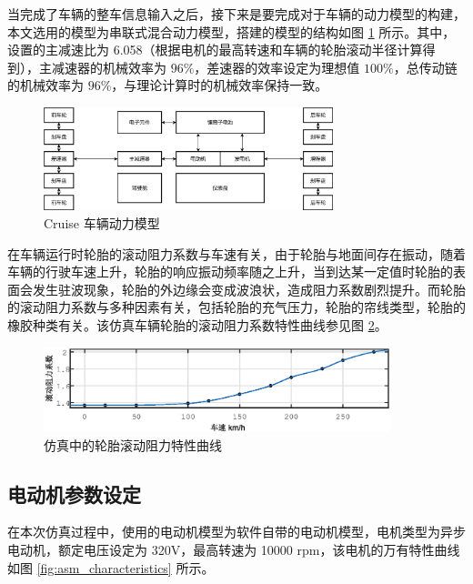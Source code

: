 当完成了车辆的整车信息输入之后，接下来是要完成对于车辆的动力模型的构建，本文选用的模型为串联式混合动力模型，搭建的模型的结构如图 \ref{fig:car_structure} 所示。其中，设置的主减速比为 6.058（根据电机的最高转速和车辆的轮胎滚动半径计算得到），主减速器的机械效率为 $96\%$，差速器的效率设定为理想值 $100\%$，总传动链的机械效率为 $96\%$，与理论计算时的机械效率保持一致。

\begin{figure}
	\centering
	\includegraphics[width=0.75\textwidth]{figures/car_structure_cruise.png}
	\caption{Cruise 车辆动力模型}\label{fig:car_structure}
\end{figure}

在车辆运行时轮胎的滚动阻力系数与车速有关，由于轮胎与地面间存在振动，随着车辆的行驶车速上升，轮胎的响应振动频率随之上升，当到达某一定值时轮胎的表面会发生驻波现象，轮胎的外边缘会变成波浪状，造成阻力系数剧烈提升。而轮胎的滚动阻力系数与多种因素有关，包括轮胎的充气压力，轮胎的帘线类型，轮胎的橡胶种类有关。该仿真车辆轮胎的滚动阻力系数特性曲线参见图 \ref{fig:tier_characteristics}。

\begin{figure}
	\centering
	\includegraphics[width=0.9\textwidth]{figures/tier_characteristics_cruise.eps}
	\caption{仿真中的轮胎滚动阻力特性曲线}\label{fig:tier_characteristics}
\end{figure}

\subsection{电动机参数设定}
在本次仿真过程中，使用的电动机模型为软件自带的电动机模型，电机类型为异步电动机，额定电压设定为 320V，最高转速为 10000 rpm，该电机的万有特性曲线如图 \ref{fig:asm_characteristics} 所示。

